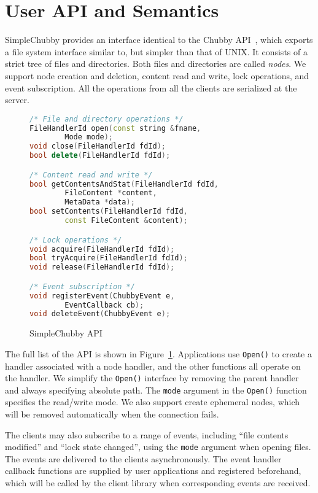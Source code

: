 \section{User API and Semantics}
\label{section:api}

SimpleChubby provides an interface identical to the Chubby API~\cite{burrows2006chubby},
which exports a file system interface similar to, but simpler than that of UNIX.
It consists of a strict tree of files and directories. Both files and directories
are called \emph{nodes}. We support node creation and deletion, content
read and write, lock operations, and event subscription.
All the operations from all the clients are serialized at the server.

\begin{figure}
\centering
\begin{lstlisting}[language=C++,
    basicstyle=\footnotesize\ttfamily,
    commentstyle=\bfseries,
    deletekeywords={delete},
    morekeywords={FileHandlerId, string, Mode, FileContent, MetaData, ChubbyEvent, EventCallback}]
/* File and directory operations */
FileHandlerId open(const string &fname,
        Mode mode);
void close(FileHandlerId fdId);
bool delete(FileHandlerId fdId);

/* Content read and write */
bool getContentsAndStat(FileHandlerId fdId,
        FileContent *content,
        MetaData *data);
bool setContents(FileHandlerId fdId,
        const FileContent &content);

/* Lock operations */
void acquire(FileHandlerId fdId);
bool tryAcquire(FileHandlerId fdId);
void release(FileHandlerId fdId);

/* Event subscription */
void registerEvent(ChubbyEvent e,
        EventCallback cb);
void deleteEvent(ChubbyEvent e);
\end{lstlisting}
\caption{SimpleChubby API}
\label{fig:api}
\end{figure}

The full list of the API is shown in Figure~\ref{fig:api}.
Applications use \texttt{Open()} to create a handler associated with a node
handler, and the other functions all operate on the handler.
We simplify the \texttt{Open()} interface by removing the parent handler and
always specifying absolute path.
The \texttt{mode} argument in the \texttt{Open()} function specifies the
read/write mode. We also support create ephemeral nodes, which will be
removed automatically when the connection fails.

The clients may also subscribe to a range of events, including ``file contents
modified'' and ``lock state changed'', using the \texttt{mode} argument when
opening files. The events are delivered to the clients asynchronously.
The event handler callback functions are supplied by user applications and
registered beforehand, which will be called by the client library when
corresponding events are received.

